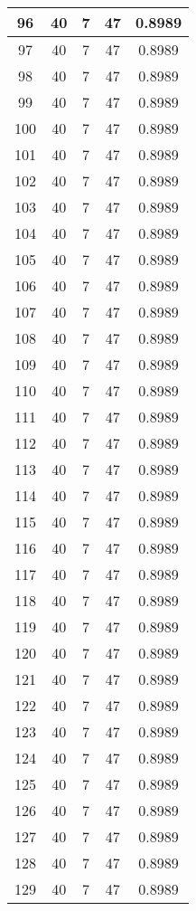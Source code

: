 \documentclass[letterpaper, 12pt]{article}
\begin{document}
\begin{longtable}{|c|c|c|c|c|}
\hline
96 & 40 & 7 & 47 & 0.8989 \\
\hline
97 & 40 & 7 & 47 & 0.8989 \\
\hline
98 & 40 & 7 & 47 & 0.8989 \\
\hline
99 & 40 & 7 & 47 & 0.8989 \\
\hline
100 & 40 & 7 & 47 & 0.8989 \\
\hline
101 & 40 & 7 & 47 & 0.8989 \\
\hline
102 & 40 & 7 & 47 & 0.8989 \\
\hline
103 & 40 & 7 & 47 & 0.8989 \\
\hline
104 & 40 & 7 & 47 & 0.8989 \\
\hline
105 & 40 & 7 & 47 & 0.8989 \\
\hline
106 & 40 & 7 & 47 & 0.8989 \\
\hline
107 & 40 & 7 & 47 & 0.8989 \\
\hline
108 & 40 & 7 & 47 & 0.8989 \\
\hline
109 & 40 & 7 & 47 & 0.8989 \\
\hline
110 & 40 & 7 & 47 & 0.8989 \\
\hline
111 & 40 & 7 & 47 & 0.8989 \\
\hline
112 & 40 & 7 & 47 & 0.8989 \\
\hline
113 & 40 & 7 & 47 & 0.8989 \\
\hline
114 & 40 & 7 & 47 & 0.8989 \\
\hline
115 & 40 & 7 & 47 & 0.8989 \\
\hline
116 & 40 & 7 & 47 & 0.8989 \\
\hline
117 & 40 & 7 & 47 & 0.8989 \\
\hline
118 & 40 & 7 & 47 & 0.8989 \\
\hline
119 & 40 & 7 & 47 & 0.8989 \\
\hline
120 & 40 & 7 & 47 & 0.8989 \\
\hline
121 & 40 & 7 & 47 & 0.8989 \\
\hline
122 & 40 & 7 & 47 & 0.8989 \\
\hline
123 & 40 & 7 & 47 & 0.8989 \\
\hline
124 & 40 & 7 & 47 & 0.8989 \\
\hline
125 & 40 & 7 & 47 & 0.8989 \\
\hline
126 & 40 & 7 & 47 & 0.8989 \\
\hline
127 & 40 & 7 & 47 & 0.8989 \\
\hline
128 & 40 & 7 & 47 & 0.8989 \\
\hline
129 & 40 & 7 & 47 & 0.8989 \\

\end{longtable}
\end{document}
